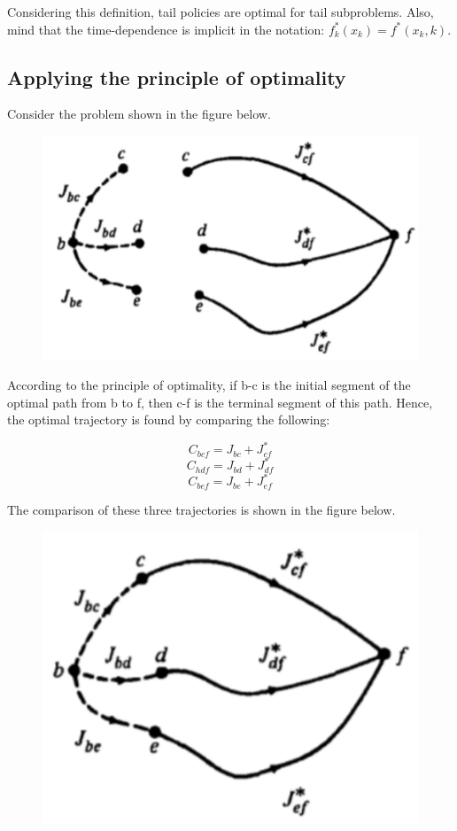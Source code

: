\documentclass[twoside]{article}
\begin{document}
Considering this definition, tail policies are optimal for tail subproblems. Also, mind that the time-dependence is implicit in the notation: $f_k^{*} ( x_k ) = f^{*}(x_k ,k )$.

\subsection{Applying the principle of optimality}
Consider the problem shown in the figure below.

\begin{figure}[!htb]
  \centering
  \includegraphics[scale=0.6]{path2.PNG}
\end{figure}

According to the principle of optimality, if b-c is the initial segment of the optimal path from b to f, then c-f is the terminal segment of this path. Hence, the optimal trajectory is found by comparing the following:

$$ C_{b c f}=J_{b c}+J_{c f}^{*}$$
$$  C_{h d f}=J_{b d}+J_{d f}^{*} $$
$$ C_{b e f}=J_{b e}+J_{e f}^{*}$$

The comparison of these three trajectories is shown in the figure below.

\begin{figure}[!htb]
  \centering
  \includegraphics[scale=0.6]{path3.PNG}
\end{figure}
\end{document}
